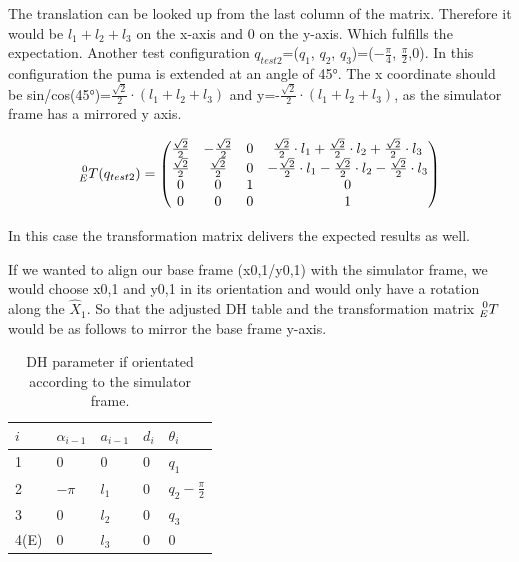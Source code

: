 The translation can be looked up from the last column of the matrix. Therefore it would be $l_1+ l_2 +l_3$ on the x-axis and 0 on the y-axis. Which fulfills the expectation. \newline
Another test configuration $q_{test2}$=($q_1$, $q_2$, $q_3$)=($-\frac{\pi}{4}$, $\frac{\pi}{2}$,0). In this configuration the puma is extended at an angle of 45°. The x coordinate should be sin/cos(45°)=$\frac{\sqrt{2}}{2}\cdot (l_1 + l_2+ l_3)$ and y=-$\frac{\sqrt{2}}{2}\cdot (l_1 + l_2+ l_3)$, as the simulator frame has a mirrored y axis.

\begin{equation}
   \prescript{0}{E}{T}(q_{test2}) = \begin{pmatrix} 
  \frac{\sqrt{2}}{2} & -\frac{\sqrt{2}}{2} & 0 & \frac{\sqrt{2}}{2} \cdot l_1 + \frac{\sqrt{2}}{2} \cdot l_2 + \frac{\sqrt{2}}{2} \cdot l_3\\
   \frac{\sqrt{2}}{2} & \frac{\sqrt{2}}{2} & 0& -\frac{\sqrt{2}}{2} \cdot l_1 - \frac{\sqrt{2}}{2} \cdot l_2 - \frac{\sqrt{2}}{2} \cdot l_3\\
   0& 0 & 1 &  0       \\
   0 & 0 & 0 & 1\end{pmatrix}
\end{equation}

In this case the transformation matrix delivers the expected results as well.


If we wanted to align our base frame (x0,1/y0,1) with the simulator frame, we would choose x0,1 and y0,1 in its orientation and would only have a rotation along the $\hat{X}_1$. So that the adjusted DH table and the transformation matrix $\prescript{0}{E}{T}$ would be as follows to mirror the base frame y-axis.

\begin{table}[H]
    \centering
    \begin{tabular}{ |p{1cm}|p{1cm}|p{1cm}|p{1cm}|p{1.5cm}|  } 
        \hline 
       $i$ & $\alpha_{i-1}$ & $a_{i-1}$ &$d_i$ & $\theta_i$\\
        \hline
        \hline
       1 &  0 & 0 & 0 & $q_1$\\
        \hline
         2 &  $-\pi$ & $l_1$ & 0 & $q_2-\frac{\pi}{2}$\\
          \hline
         3 &  0 &$l_2$& 0 & $q_3$\\
         \hline
         4(E) &  0 & $l_3$ & 0 & 0\\
        \hline
    \end{tabular}
    \caption{DH parameter if orientated according to the simulator frame.}
    \label{Table:DH_simFrame}
\end{table}

